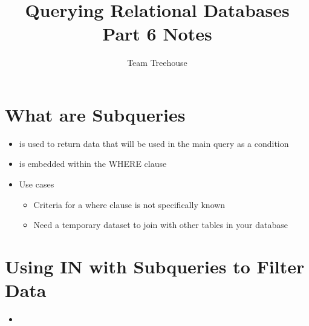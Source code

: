 \documentclass[12pt]{article}
\begin{document}
\title{Querying Relational Databases Part 6 Notes}
\author{Team Treehouse}
\maketitle

\bigskip

\section{What are Subqueries}

\bigskip

\begin{itemize}
    \item is used to return data that will be used in the main query as a condition
    \item is embedded within the WHERE clause
    \item Use cases
    \begin{itemize}
        \item Criteria for a where clause is not specifically known
        \item Need a temporary dataset to join with other tables in your database
    \end{itemize}
\end{itemize}

\bigskip

\section{Using IN with Subqueries to Filter Data}

\bigskip

\begin{itemize}
    \item
\end{itemize}
\end{document}
